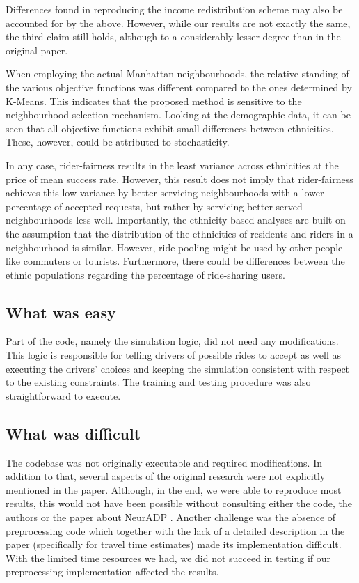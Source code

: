 Differences found in reproducing the income redistribution scheme may also be accounted for by the above. However, while our results are not exactly the same, the third claim still holds, although to a considerably lesser degree than in the original paper.

When employing the actual Manhattan neighbourhoods, the relative standing of the various objective functions was different compared to the ones determined by K-Means. This indicates that the proposed method is sensitive to the neighbourhood selection mechanism. Looking at the demographic data, it can be seen that all objective functions exhibit small differences between ethnicities. These, however, could be attributed to stochasticity.

In any case, rider-fairness results in the least variance across ethnicities at the price of mean success rate. However, this result does not imply that rider-fairness achieves this low variance by better servicing neighbourhoods with a lower percentage of accepted requests, but rather by servicing better-served neighbourhoods less well. Importantly, the ethnicity-based analyses are built on the assumption that the distribution of the ethnicities of residents and riders in a neighbourhood is similar. However, ride pooling might be used by other people like commuters or tourists. Furthermore, there could be differences between the ethnic populations regarding the percentage of ride-sharing users.

\subsection{What was easy}
Part of the code, namely the simulation logic, did not need any modifications. This logic is responsible for telling drivers of possible rides to accept as well as executing the drivers' choices and keeping the simulation consistent with respect to the existing constraints. The training and testing procedure was also straightforward to execute. 

\subsection{What was difficult}
The codebase was not originally executable and required modifications. In addition to that, several aspects of the original research were not explicitly mentioned in the paper. Although, in the end, we were able to reproduce most results, this would not have been possible without consulting either the code, the authors or the paper about NeurADP \cite{shah20}. Another challenge was the absence of preprocessing code which together with the lack of a detailed description in the paper (specifically for travel time estimates) made its implementation difficult. With the limited time resources we had, we did not succeed in testing if our preprocessing implementation affected the results. 

